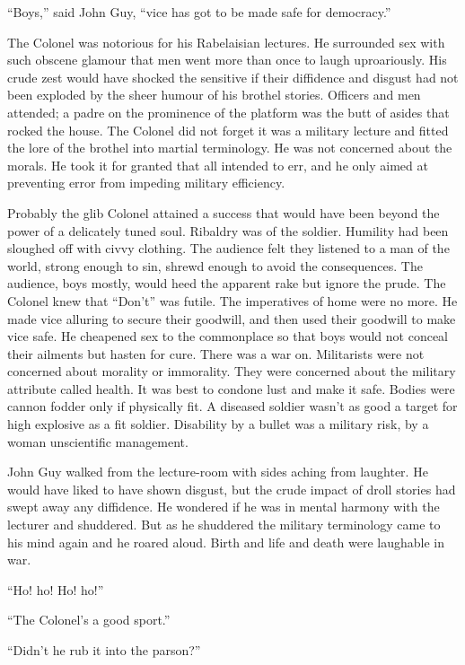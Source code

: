 ``Boys,'' said John Guy, ``vice has got to be made safe for 
democracy.''

The Colonel was notorious for his Rabelaisian lectures. He 
surrounded sex with such obscene glamour that men went 
more than once to laugh uproariously. His crude zest 
would have shocked the sensitive if their diffidence and 
disgust had not been exploded by the sheer humour of his 
brothel stories. Officers and men attended; a padre on 
the prominence of the platform was the butt of asides that 
rocked the house. The Colonel did not forget it was a 
military lecture and fitted the lore of the brothel 
into martial terminology. He was not concerned about the 
morals. He took it for granted that all intended to err, 
and he only aimed at preventing error from impeding 
military efficiency.

Probably the glib Colonel attained a success that would 
have been beyond the power of a delicately tuned soul. 
Ribaldry was of the soldier. Humility had been sloughed 
off with civvy clothing. The audience felt they listened 
to a man of the world, strong enough to sin, shrewd enough 
to avoid the consequences. The audience, boys mostly, 
would heed the apparent rake but ignore the prude. The 
Colonel knew that ``Don't'' was futile. The imperatives 
of home were no more. He made vice alluring to secure 
their goodwill, and then used their goodwill to make vice 
safe. He cheapened sex to the commonplace so that boys 
would not conceal their ailments but hasten for cure. There 
was a war on. Militarists were not concerned about morality 
or immorality. They were concerned about the military attribute 
called health. It was best to condone lust and make it safe. 
Bodies were cannon fodder only if physically fit. A diseased 
soldier wasn't as good a target for high explosive as a fit 
soldier. Disability by a bullet was a military risk, by a 
woman unscientific management.

John Guy walked from the lecture-room with sides aching from 
laughter. He would have liked to have shown disgust, but 
the crude impact of droll stories had swept away any diffidence. 
He wondered if he was in mental harmony with the lecturer and 
shuddered. But as he shuddered the military terminology came 
to his mind again and he roared aloud. Birth and life and 
death were laughable in war.

``Ho! ho! Ho! ho!''

``The Colonel's a good sport.''

``Didn't he rub it into the parson?''

